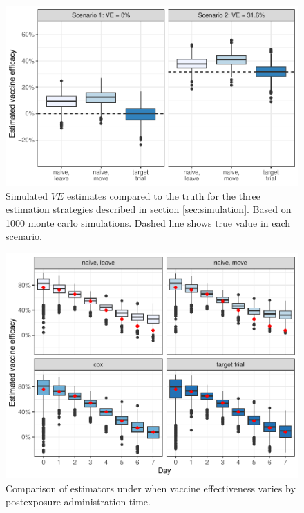 \begin{appendices}
\begin{refsection}
    \clearpage 

    \begin{figure}[p]
        \centering
        \includegraphics{../../../../3_figures/sim_rr.pdf}
        \caption{Simulated $VE$ estimates compared to the truth for the three estimation strategies described in section \ref{sec:simulation}. Based on 1000 monte carlo simulations. Dashed line shows true value in each scenario. \label{fig:sim_results_appendix}}
    \end{figure}

    \clearpage

    \begin{figure}[p]
        \centering
        \includegraphics{../../../../3_figures/sim_hetx.pdf}
        \caption{Comparison of estimators under when vaccine effectiveness varies by postexposure administration time.\label{fig:sim_hetx}}
    \end{figure}


\end{refsection}
\end{appendices}
